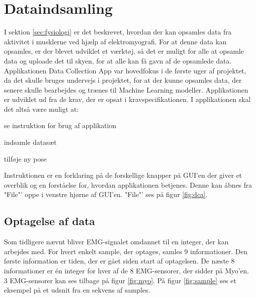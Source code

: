 \thispagestyle{fancy}
\chapter{Dataindsamling}
\label{chp:dataingsamlingChapter}
I sektion \ref{sec:fysiologi} er det beskrevet, hvordan der kan opsamles data fra aktivitet i musklerne ved hjælp af elektromyografi. For at denne data kan opsamles, er der blevet udviklet et værktøj, så det er muligt for alle at opsamle data og uploade det til skyen, for at alle kan få gavn af de opsamlede data. Applikationen Data Collection App var hovedfokus i de første uger af projektet, da det skulle bruges undervejs i projektet, for at der kunne opsamles data, der senere skulle bearbejdes og trænes til Machine Learning modeller. Applikationen er udviklet ud fra de krav, der er opsat i kravspecifikationen\citep{RefWorks:8}. I applikationen skal det altså være muligt at:
\begin{myItemize}
	\item se instruktion for brug af applikation
	\item indsamle datasæt
	\item tilføje ny pose
\end{myItemize}
Instruktionen er en forklaring på de forskellige knapper på GUI'en der giver et overblik og en forståelse for, hvordan applikationen betjenes. Denne kan åbnes fra "File"' oppe i venstre hjørne af GUI'en. "File"' ses på figur \ref{fig:dca}.

\section{Optagelse af data}
\label{sec:optagelsedata}
Som tidligere nævnt bliver EMG-signalet omdannet til en integer, der kan arbejdes med. For hvert enkelt sample, der optages, samles 9 informationer. Den første information er tiden, der er gået siden start af optagelsen. De næste 8 informationer er én integer for hver af de 8 EMG-sensorer, der sidder på Myo'en. 3 EMG-sensorer kan ses tilbage på figur \ref{fig:myo}.
På figur \ref{fig:sample} ses et eksempel på et udsnit fra en sekvens af samples.


